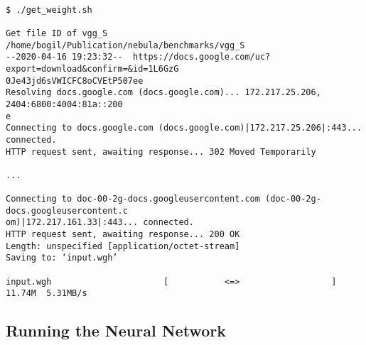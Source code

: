 \documentclass[10pt]{article}
\begin{document}
\begin{Verbatim}[frame=single,fontsize=\small]

$ ./get_weight.sh

Get file ID of vgg_S
/home/bogil/Publication/nebula/benchmarks/vgg_S
--2020-04-16 19:23:32--  https://docs.google.com/uc?export=download&confirm=&id=1L6GzG
0Je43jd6sVWICFC8oCVEtP507ee
Resolving docs.google.com (docs.google.com)... 172.217.25.206, 2404:6800:4004:81a::200
e
Connecting to docs.google.com (docs.google.com)|172.217.25.206|:443... connected.
HTTP request sent, awaiting response... 302 Moved Temporarily

...

Connecting to doc-00-2g-docs.googleusercontent.com (doc-00-2g-docs.googleusercontent.c
om)|172.217.161.33|:443... connected.
HTTP request sent, awaiting response... 200 OK
Length: unspecified [application/octet-stream]
Saving to: ‘input.wgh’

input.wgh                      [           <=>                  ]  11.74M  5.31MB/s

\end{Verbatim}

\subsection{Running the Neural Network} \label{subsec:running_network}
\end{document}
